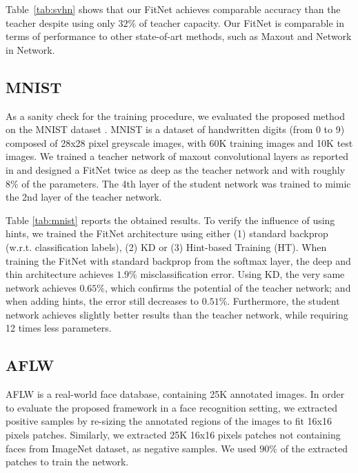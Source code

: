 \documentclass{article} %
\begin{document}
Table~\ref{tab:svhn} shows that our FitNet achieves comparable accuracy than the teacher
despite using only $32\%$ of teacher capacity. Our FitNet is comparable in terms of performance
to other state-of-art methods, such as Maxout and Network in Network.

\vspace*{-1mm}
\subsection{MNIST}
\vspace*{-1mm}

As a sanity check for the training procedure, we evaluated the proposed method
on the MNIST dataset \citep{Lecun98}. MNIST is a dataset of handwritten
digits (from 0 to 9) composed of 28x28 pixel greyscale images, with 60K
training images and 10K test images. We trained a teacher network of maxout convolutional layers as reported in
\citet{Goodfellow13} and designed a FitNet twice as deep as the teacher network and with roughly $8\%$ of the
parameters. The 4th layer of the student network was trained to mimic the 2nd layer of the teacher network.

Table \ref{tab:mnist} reports the obtained results. To verify the influence of
using hints, we trained the FitNet architecture using either (1) standard backprop (w.r.t. classification labels), (2) KD
or (3) Hint-based Training (HT). When training the FitNet with standard backprop from the softmax layer, the deep and thin architecture achieves 
$1.9\%$ misclassification error. Using KD, the very same network achieves $0.65\%$, which confirms the potential of the teacher network; 
and when adding hints, the error still decreases to $0.51\%$. Furthermore, the student network achieves slightly better
results than the teacher network, while requiring 12 times less parameters.

\vspace*{-1mm}
\subsection{AFLW}
\vspace*{-1mm}

AFLW \citep{AFLW} is a real-world face database, containing 25K annotated images. In order to evaluate the proposed framework in a face recognition setting, we extracted positive samples by re-sizing the annotated regions of the images to fit 16x16 pixels patches. Similarly, we extracted 25K 16x16 pixels patches not containing faces from ImageNet \citep{ImageNet} dataset, as negative samples. We used  $90\%$ of the extracted patches to train the network.
\end{document}
